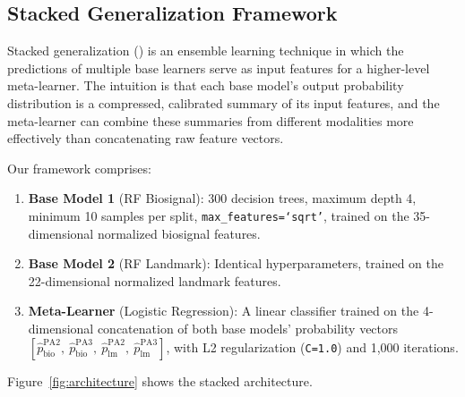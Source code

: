 \documentclass[10pt, twocolumn]{article}
\begin{document}
\subsection{Stacked Generalization Framework}
\label{sec:stacking}

Stacked generalization (\cite{Wolpert1992}) is an ensemble learning technique in which the
predictions of multiple base learners serve as input features for a higher-level
meta-learner. The intuition is that each base model's output probability distribution is a
compressed, calibrated summary of its input features, and the meta-learner can combine
these summaries from different modalities more effectively than concatenating raw feature
vectors.

Our framework comprises:

\begin{enumerate}
  \item \textbf{Base Model 1} (RF Biosignal): 300 decision trees, maximum depth 4,
        minimum 10 samples per split, \texttt{max\_features=`sqrt'}, trained on the
        35-dimensional normalized biosignal features.
  \item \textbf{Base Model 2} (RF Landmark): Identical hyperparameters, trained on the
        22-dimensional normalized landmark features.
  \item \textbf{Meta-Learner} (Logistic Regression): A linear classifier trained on the
        4-dimensional concatenation of both base models' probability vectors
        $[\hat{p}_{\text{bio}}^{\text{PA2}},\ \hat{p}_{\text{bio}}^{\text{PA3}},\
          \hat{p}_{\text{lm}}^{\text{PA2}},\ \hat{p}_{\text{lm}}^{\text{PA3}}]$,
        with L2 regularization (\texttt{C=1.0}) and 1,000 iterations.
\end{enumerate}

Figure~\ref{fig:architecture} shows the stacked architecture.
\end{document}
